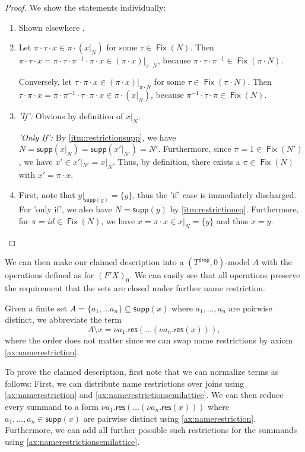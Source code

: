 \documentclass[11pt,a4paper]{amsart}
\newcommand{\res}{\mathsf{res}}
\newcommand{\drop}{\mathsf{drop}}
\newcommand{\supp}{\mathsf{supp}}
\newcommand{\Fix}{\mathop{\mathsf{Fix}}}
\theoremstyle{plain}
\newcommand{\id}{\mathit{id}}
\numberwithin{equation}{section}
\newcommand{\+}[1]{\mathcal{#1}\xspace}
\theoremstyle{definition}
\begin{document}
\begin{proof}
  We show the statements individually:
  \begin{enumerate}
    \item Shown elsewhere \cite[Lemma 5.8]{SchroderEA17}.
    \item
      Let $\pi \cdot \tau \cdot x \in \pi \cdot (x|_N)$ for some $\tau \in \Fix(N)$.
      Then $\pi \cdot \tau \cdot x = \pi \cdot \tau \cdot \pi^{-1} \cdot \pi \cdot x \in (\pi \cdot x)|_{\pi \cdot N}$, because $\pi \cdot \tau \cdot \pi^{-1} \in \Fix(\pi \cdot N)$.

      Conversely, let $\tau \cdot \pi \cdot x \in (\pi \cdot x)|_{\pi \cdot N}$ for some $\tau \in \Fix(\pi \cdot N)$.
      Then $\tau \cdot \pi \cdot x = \pi \cdot \pi^{-1} \cdot \tau \cdot \pi \cdot x \in \pi \cdot (x|_N)$, because $\pi^{-1} \cdot \tau \cdot \pi \in \Fix(N)$.
    \item
      \emph{'If':} Obvious by definition of $x|_N$.

      \emph{'Only If':}
      By \eqref{itm:restrictionsupp}, we have $N = \supp(x|_N) = \supp(x'|_{N'}) = N'$.
      Furthermore, since $\pi = 1 \in \Fix(N')$, we have $x' \in x'|_{N'} = x|_N$.
      Thus, by definition, there exists a $\pi \in \Fix(N)$ with $x' = \pi \cdot x$.
    \item
      First, note that $y|_{\supp(y)} = \{y\}$, thus the 'if' case is immediately discharged.
      For 'only if', we also have $N = \supp(y)$ by \eqref{itm:restrictioneq}.
      Furthermore, for $\pi = \id \in \Fix(N)$, we have $x = \pi \cdot x \in x|_N = \{y\}$ and thus $x = y$.
  \end{enumerate}
\end{proof}

We can then make our claimed description into a $(T^\drop, 0)$-model $A$ with the operations defined as for $(F'X)_0$.
We can easily see that all operations preserve the requirement that the sets are closed under further name restriction.

Given a finite set $A = \{a_1, \dots a_n\} \subseteq \supp(x)$ where $a_1, \dots, a_n$ are pairwise distinct, we abbreviate the term
\begin{equation*}
  A \setminus x = \nu a_1.\res(\dots(\nu a_n.\res(x))),
\end{equation*}
where the order does not matter since we can swap name restrictions by axiom \eqref{ax:namerestriction}.

To prove the claimed description, first note that we can normalize terms as follows:
First, we can distribute name restrictions over joins using \eqref{ax:namerestriction} and \eqref{ax:namerestrictionsemilattice}.
We can then reduce every summand to a form $\nu a_1.\res(\dots (\nu a_n.\res(x)))$ where $a_1, \dots, a_n \in \supp(x)$ are pairwise distinct using \eqref{ax:namerestriction}.
Furthermore, we can add all further possible such restrictions for the summands using \eqref{ax:namerestrictionsemilattice}.
\end{document}
